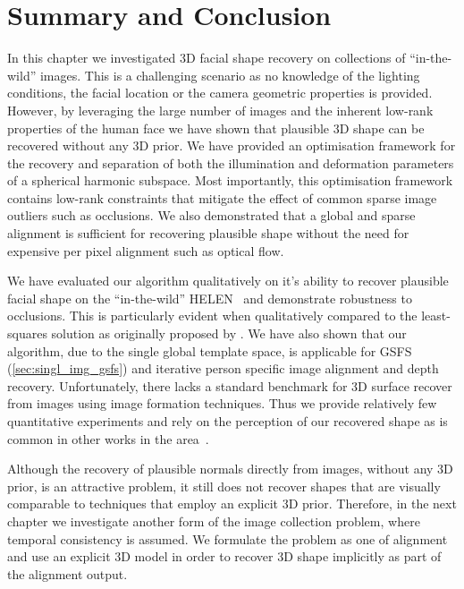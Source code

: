 \section{Summary and Conclusion}\label{sec:imag_coll_summary}
In this chapter we investigated 3D facial shape recovery on collections of
``in-the-wild'' images. This is a challenging scenario as no knowledge of the
lighting conditions, the facial location or the camera geometric properties is
provided. However, by leveraging the large number of images and the inherent
low-rank properties of the human face we have shown that plausible 3D shape
can be recovered without any 3D prior. We have provided an optimisation
framework for the recovery and separation of both the illumination and
deformation parameters of a spherical harmonic subspace. Most importantly,
this optimisation framework contains low-rank constraints that mitigate the
effect of common sparse image outliers such as occlusions. We also demonstrated
that a global and sparse alignment is sufficient for recovering plausible shape
without the need for expensive per pixel alignment such as optical flow.

We have evaluated our algorithm qualitatively on it's ability to recover
plausible facial shape on the ``in-the-wild'' HELEN~\cite{le2012interactive}
and demonstrate robustness to occlusions. This is particularly evident when
qualitatively compared to the least-squares solution as originally proposed by
\citet{KemelmacherShlizerman:2013iv}. We have also shown that our algorithm,
due to the single global template space, is applicable for 
GSFS (\cref{sec:singl_img_gsfs}) and iterative person specific image alignment
and depth recovery. Unfortunately, there lacks a standard benchmark for
3D surface recover from images using image formation techniques. Thus we provide
relatively few quantitative experiments and rely on the perception of our
recovered shape as is common in other works in the
area~\cite{KemelmacherShlizerman:2013iv,kemelmacher2011face,kemelmacher2012collection}.

Although the recovery of plausible normals directly from images, without any
3D prior, is an attractive problem, it still does not recover shapes that
are visually comparable to techniques that employ an explicit 3D prior. Therefore,
in the next chapter we investigate another form of the image collection problem,
where temporal consistency is assumed. We formulate the problem as one of alignment
and use an explicit 3D model in order to recover 3D shape implicitly as part
of the alignment output.
